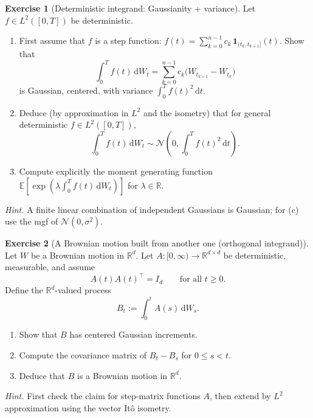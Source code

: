 \documentclass[11pt]{article}
\newcommand{\E}{\mathbb{E}}
\newcommand{\R}{\mathbb{R}}
\newcommand{\1}{\mathbf{1}}
\theoremstyle{definition}
\newtheorem{exercise}{Exercise}[section]
\begin{document}
\begin{exercise}[Deterministic integrand: Gaussianity + variance]
Let $f\in L^2([0,T])$ be deterministic.
\begin{enumerate}[label=\textbf{(\alph*)}, itemsep=0.25em]
\item First assume that $f$ is a step function:
$f(t)=\sum_{k=0}^{n-1}c_k\,\1_{(t_k,t_{k+1}]}(t)$.
Show that
$$
\int_0^T f(t)\,\mathrm{d} W_t
=\sum_{k=0}^{n-1}c_k\big(W_{t_{k+1}}-W_{t_k}\big)
$$
is Gaussian, centered, with variance $\int_0^T f(t)^2\,\mathrm{d} t$.
\item Deduce (by approximation in $L^2$ and the isometry) that for general deterministic
$f\in L^2([0,T])$,
$$
\int_0^T f(t)\,\mathrm{d} W_t \sim \mathcal{N}\!\left(0,\int_0^T f(t)^2\,\mathrm{d} t\right).
$$
\item Compute explicitly the moment generating function
$\E[\exp(\lambda\int_0^T f(t)\,\mathrm{d} W_t)]$ for $\lambda\in\R$.
\end{enumerate}

\smallskip
\noindent\textit{Hint.}
A finite linear combination of independent Gaussians is Gaussian; for (c) use the mgf of
$\mathcal{N}(0,\sigma^2)$.
\end{exercise}

\begin{exercise}[A Brownian motion built from another one (orthogonal integrand)]
Let $W$ be a Brownian motion in $\R^d$.
Let $A:[0,\infty)\to\R^{d\times d}$ be deterministic, measurable, and assume
$$
A(t)A(t)^\top = I_d \qquad \text{for all } t\ge 0.
$$
Define the $\R^d$-valued process
$$
B_t := \int_0^t A(s)\,\mathrm{d} W_s.
$$
\begin{enumerate}[label=\textbf{(\alph*)}, itemsep=0.25em]
\item Show that $B$ has centered Gaussian increments.
\item Compute the covariance matrix of $B_t-B_s$ for $0\le s<t$.
\item Deduce that $B$ is a Brownian motion in $\R^d$.
\end{enumerate}

\smallskip
\noindent\textit{Hint.}
First check the claim for step-matrix functions $A$, then extend by $L^2$ approximation
using the vector It\^o isometry.
\end{exercise}


\end{document}
